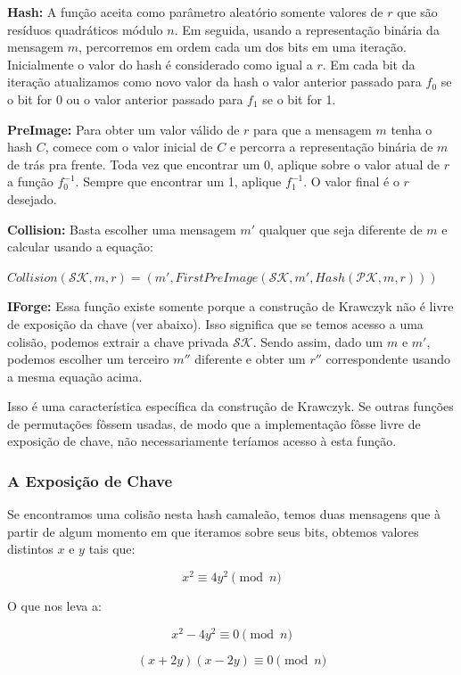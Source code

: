 \documentclass[a4paper]{article}
\begin{document}
\textbf{Hash:} A função aceita como parâmetro aleatório somente
valores de $r$ que são resíduos quadráticos módulo $n$. Em seguida,
usando a representação binária da mensagem $m$, percorremos em ordem
cada um dos bits em uma iteração. Inicialmente o valor do hash é
considerado como igual a $r$. Em cada bit da iteração atualizamos como
novo valor da hash o valor anterior passado para $f_0$ se o bit for 0
ou o valor anterior passado para $f_1$ se o bit for 1.

\textbf{PreImage:} Para obter um valor válido de $r$ para que a
mensagem $m$ tenha o hash $C$, comece com o valor inicial de $C$ e
percorra a representação binária de $m$ de trás pra frente. Toda vez
que encontrar um 0, aplique sobre o valor atual de $r$ a função
$f_0^{-1}$. Sempre que encontrar um 1, aplique $f_1^{-1}$. O valor
final é o $r$ desejado.

\textbf{Collision:} Basta escolher uma mensagem $m'$ qualquer que seja
diferente de $m$ e calcular usando a equação:

$Collision(\mathcal{SK}, m, r) = (m', FirstPreImage(\mathcal{SK}, m',
Hash(\mathcal{PK}, m, r)))$

\textbf{IForge:} Essa função existe somente porque a construção de
Krawczyk não é livre de exposição da chave (ver abaixo). Isso
significa que se temos acesso a uma colisão, podemos extrair a chave
privada $\mathcal{SK}$. Sendo assim, dado um $m$ e $m'$, podemos
escolher um terceiro $m''$ diferente e obter um $r''$ correspondente
usando a mesma equação acima.

Isso é uma característica específica da construção de Krawczyk. Se
outras funções de permutações fôssem usadas, de modo que a
implementação fôsse livre de exposição de chave, não necessariamente
teríamos acesso à esta função.

\subsubsection{A Exposição de Chave}

Se encontramos uma colisão nesta hash camaleão, temos duas mensagens
que à partir de algum momento em que iteramos sobre seus bits, obtemos
valores distintos $x$ e $y$ tais que:

$$
x^2 \equiv 4y^2 \pmod n
$$

O que nos leva a:

$$
x^2 - 4y^2 \equiv 0 \pmod n
$$

$$
(x+2y)(x-2y) \equiv 0 \pmod n
$$
\end{document}
